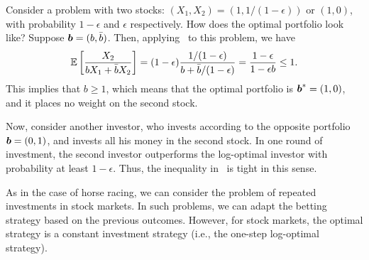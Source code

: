     \begin{remark}
        \label{remark:counterexample-portfolio} Consider a problem with two stocks: $(X_1, X_2) = (1, 1/(1-\epsilon))$ or $(1, 0)$, with probability $1-\epsilon$ and $\epsilon$ respectively. How does the optimal portfolio look like? Suppose $\boldsymbol{b} = (b, \bar{b})$. Then, applying~ to this problem, we have 
        \begin{align}
            \mathbb{E}\left[ \frac{X_2}{b X_1 + \bar{b} X_2} \right] = (1-\epsilon) \frac{1/(1-\epsilon)}{b + \bar{b}/(1-\epsilon)} = \frac{1-\epsilon}{1 - \epsilon b} \leq 1. 
        \end{align}
        This implies that $b \geq 1$, which means that the optimal portfolio is $\boldsymbol{b}^* = (1, 0)$, and it places no weight on the second stock. 

        Now, consider another investor, who invests according to the opposite portfolio $\boldsymbol{b} = (0, 1)$, and invests all his money in the second stock. In one round of investment, the second investor outperforms the log-optimal investor with probability at least $1-\epsilon$. Thus, the inequality in~ is tight in this sense. 
    \end{remark}

    As in the case of horse racing, we can consider the problem of repeated investments in stock markets. In such problems, we can adapt the betting strategy based on the previous outcomes. However, for \iid stock markets, the optimal strategy is a constant investment strategy (i.e., the one-step log-optimal strategy). 

